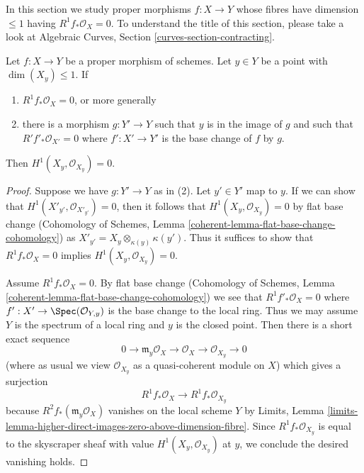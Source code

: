 \noindent
In this section we study proper morphisms $f : X \to Y$ whose fibres
have dimension $\leq 1$ having $R^1f_*\mathcal{O}_X = 0$.
To understand the title of this section, please take a look at
Algebraic Curves, Section \ref{curves-section-contracting}.

\begin{lemma}
\label{lemma-check-h1-fibre-zero}
Let $f : X \to Y$ be a proper morphism of schemes. Let $y \in Y$
be a point with $\dim(X_y) \leq 1$. If
\begin{enumerate}
\item $R^1f_*\mathcal{O}_X = 0$, or more generally
\item there is a morphism $g : Y' \to Y$ such that $y$ is in the image
of $g$ and such that $R'f'_*\mathcal{O}_{X'} = 0$ where $f' : X' \to Y'$
is the base change of $f$ by $g$.
\end{enumerate}
Then $H^1(X_y, \mathcal{O}_{X_y}) = 0$.
\end{lemma}

\begin{proof}
Suppose we have $g : Y' \to Y$ as in (2).
Let $y' \in Y'$ map to $y$. If we can show that
$H^1(X'_{y'}, \mathcal{O}_{X'_{y'}}) = 0$, then it follows
that $H^1(X_y, \mathcal{O}_{X_y}) = 0$ by flat base change
(Cohomology of Schemes, Lemma
\ref{coherent-lemma-flat-base-change-cohomology})
as $X'_{y'} = X_y \otimes_{\kappa(y)} \kappa(y')$.
Thus it suffices to show that
$R^1f_*\mathcal{O}_X = 0$ implies $H^1(X_y, \mathcal{O}_{X_y}) = 0$.

\medskip\noindent
Assume $R^1f_*\mathcal{O}_X = 0$. By flat base change
(Cohomology of Schemes, Lemma
\ref{coherent-lemma-flat-base-change-cohomology})
we see that $R^1f'_*\mathcal{O}_X = 0$ where
$f' : X' \to \Spec(\mathcal{O}_{Y, y})$ is the base
change to the local ring. Thus we may assume $Y$ is the spectrum
of a local ring and $y$ is the closed point.
Then there is a short exact sequence
$$
0 \to \mathfrak m_y\mathcal{O}_X \to
\mathcal{O}_X \to \mathcal{O}_{X_y} \to 0
$$
(where as usual we view $\mathcal{O}_{X_y}$
as a quasi-coherent module on $X$)
which gives a surjection
$$
R^1f_*\mathcal{O}_X \to R^1f_*\mathcal{O}_{X_y}
$$
because $R^2f_*(\mathfrak m_y\mathcal{O}_X)$ vanishes
on the local scheme $Y$ by Limits, Lemma
\ref{limits-lemma-higher-direct-images-zero-above-dimension-fibre}.
Since $R^1f_*\mathcal{O}_{X_y}$ is equal to the skyscraper sheaf
with value $H^1(X_y, \mathcal{O}_{X_y})$ at $y$, we conclude
the desired vanishing holds.
\end{proof}

